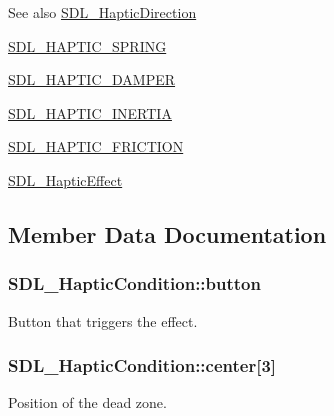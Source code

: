 \begin{DoxySeeAlso}{See also}
\hyperlink{struct_s_d_l___haptic_direction}{S\+D\+L\+\_\+\+Haptic\+Direction} 

\hyperlink{_s_d_l__haptic_8h_a3b52d4700380085e2b5d87bb20320fb1}{S\+D\+L\+\_\+\+H\+A\+P\+T\+I\+C\+\_\+\+S\+P\+R\+I\+N\+G} 

\hyperlink{_s_d_l__haptic_8h_a69522f261973e3ea4273486141320a87}{S\+D\+L\+\_\+\+H\+A\+P\+T\+I\+C\+\_\+\+D\+A\+M\+P\+E\+R} 

\hyperlink{_s_d_l__haptic_8h_a14b807471589120395aec28293cf6642}{S\+D\+L\+\_\+\+H\+A\+P\+T\+I\+C\+\_\+\+I\+N\+E\+R\+T\+I\+A} 

\hyperlink{_s_d_l__haptic_8h_a98a5011311168d63921aaac21403a4d8}{S\+D\+L\+\_\+\+H\+A\+P\+T\+I\+C\+\_\+\+F\+R\+I\+C\+T\+I\+O\+N} 

\hyperlink{union_s_d_l___haptic_effect}{S\+D\+L\+\_\+\+Haptic\+Effect} 
\end{DoxySeeAlso}


\subsection{Member Data Documentation}
\hypertarget{struct_s_d_l___haptic_condition_acd35a9d432ad122bf7824b16974eac7a}{}
\subsubsection[{button}]{ S\+D\+L\+\_\+\+Haptic\+Condition\+::button}\label{struct_s_d_l___haptic_condition_acd35a9d432ad122bf7824b16974eac7a}
Button that triggers the effect. \hypertarget{struct_s_d_l___haptic_condition_a8a71ec28ff5ab85246cbc59736aa2c53}{}
\subsubsection[{center}]{ S\+D\+L\+\_\+\+Haptic\+Condition\+::center\mbox{[}3\mbox{]}}\label{struct_s_d_l___haptic_condition_a8a71ec28ff5ab85246cbc59736aa2c53}
Position of the dead zone. \hypertarget{struct_s_d_l___haptic_condition_af684c8eeeb719739a32723c00c5a2bbd}{}
